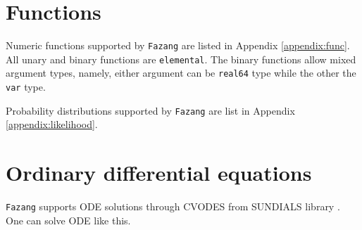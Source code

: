 \documentclass[12pt, reqno, oneside]{amsbook}
\numberwithin{equation}{chapter}
\begin{document}
\section{Functions}
\label{sec:org99b01eb}
Numeric functions supported by \texttt{Fazang} are listed in Appendix \ref{appendix:func}. All unary and
binary functions are \texttt{elemental}. The binary functions allow mixed
argument types, namely, either argument can be \texttt{real64} type while the
other the \texttt{var} type.

Probability distributions supported by \texttt{Fazang} are list in Appendix \ref{appendix:likelihood}.

\section{Ordinary differential equations}
\label{sec:orgadcba86}
\texttt{Fazang} supports ODE solutions through CVODES from SUNDIALS library
\cite{hindmarsh2005sundials}. One can solve ODE like this.
\end{document}
